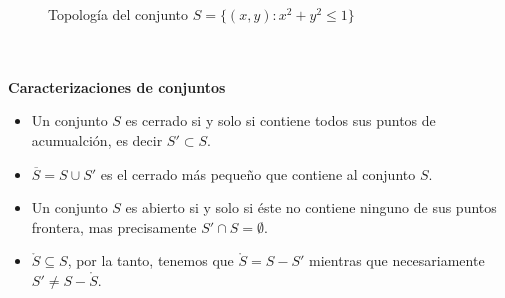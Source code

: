 \begin{figure}[h]
  \caption{Topolog\'ia del conjunto $S = \{(x, y): x^2 + y^2 \leqslant 1\}$}
\end{figure}\label{top}


~\\ \\

\textbf{Caracterizaciones de conjuntos}\\

\begin{itemize}%
   \item Un conjunto $S$ es cerrado si y solo si contiene todos sus puntos de acumualci\'on, es decir $S' \subset S$.
   \item $\overline{S} = S \cup S'$ es el cerrado m\'as peque\~no que contiene al conjunto $S$.
   \item Un conjunto $S$ es abierto si y solo si \'este no contiene ninguno de sus puntos frontera, mas precisamente $S' \cap S = \emptyset$.
   \item $\mathring{S} \subseteq S$, por la tanto, tenemos que $\mathring{S} = S - S'$ mientras que necesariamente
	$S' \neq S - \mathring{S}$.
\end{itemize}

